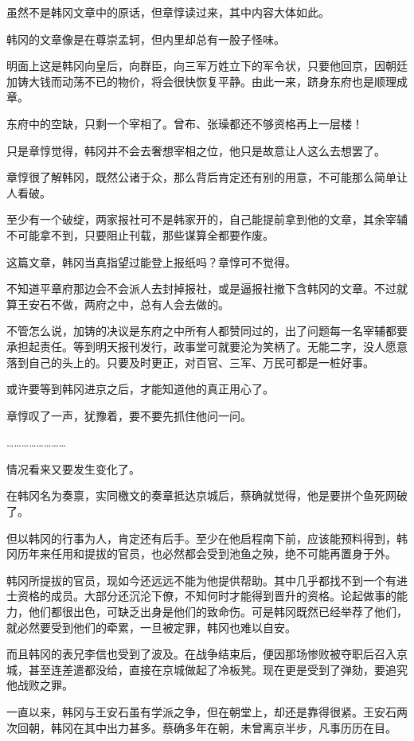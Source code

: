 虽然不是韩冈文章中的原话，但章惇读过来，其中内容大体如此。

韩冈的文章像是在尊崇孟轲，但内里却总有一股子怪味。

明面上这是韩冈向皇后，向群臣，向三军万姓立下的军令状，只要他回京，因朝廷加铸大钱而动荡不已的物价，将会很快恢复平静。由此一来，跻身东府也是顺理成章。

东府中的空缺，只剩一个宰相了。曾布、张璪都还不够资格再上一层楼！

只是章惇觉得，韩冈并不会去奢想宰相之位，他只是故意让人这么去想罢了。

章惇很了解韩冈，既然公诸于众，那么背后肯定还有别的用意，不可能那么简单让人看破。

至少有一个破绽，两家报社可不是韩家开的，自己能提前拿到他的文章，其余宰辅不可能拿不到，只要阻止刊载，那些谋算全都要作废。

这篇文章，韩冈当真指望过能登上报纸吗？章惇可不觉得。

不知道平章府那边会不会派人去封掉报社，或是逼报社撤下含韩冈的文章。不过就算王安石不做，两府之中，总有人会去做的。

不管怎么说，加铸的决议是东府之中所有人都赞同过的，出了问题每一名宰辅都要承担起责任。等到明天报刊发行，政事堂可就要沦为笑柄了。无能二字，没人愿意落到自己的头上的。只要及时更正，对百官、三军、万民可都是一桩好事。

或许要等到韩冈进京之后，才能知道他的真正用心了。

章惇叹了一声，犹豫着，要不要先抓住他问一问。

……………………

情况看来又要发生变化了。

在韩冈名为奏禀，实同檄文的奏章抵达京城后，蔡确就觉得，他是要拼个鱼死网破了。

但以韩冈的行事为人，肯定还有后手。至少在他启程南下前，应该能预料得到，韩冈历年来任用和提拔的官员，也必然都会受到池鱼之殃，绝不可能再置身于外。

韩冈所提拔的官员，现如今还远远不能为他提供帮助。其中几乎都找不到一个有进士资格的成员。大部分还沉沦下僚，不知何时才能得到晋升的资格。论起做事的能力，他们都很出色，可缺乏出身是他们的致命伤。可是韩冈既然已经举荐了他们，就必然要受到他们的牵累，一旦被定罪，韩冈也难以自安。

而且韩冈的表兄李信也受到了波及。在战争结束后，便因那场惨败被夺职后召入京城，甚至连差遣都没给，直接在京城做起了冷板凳。现在更是受到了弹劾，要追究他战败之罪。

一直以来，韩冈与王安石虽有学派之争，但在朝堂上，却还是靠得很紧。王安石两次回朝，韩冈在其中出力甚多。蔡确多年在朝，未曾离京半步，凡事历历在目。

